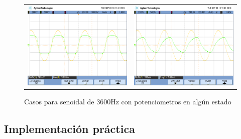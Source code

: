\begin{figure}[H]
\begin{tabular}{c c}
        \includegraphics[scale=0.2]{../EJ5/Mediciones/Osciloscopio/Senoide_3600_Medio/scope_16.png} &
        \includegraphics[scale=0.2]{../EJ5/Mediciones/Osciloscopio/Senoide_3600_Medio/scope_17.png}
    \end{tabular}
    \caption{Casos para senoidal de 3600Hz con potenciometros en alg\'un estado}
    \label{fig:senoide_3600_medio}
\end{figure}

\subsection{Implementaci\'on pr\'actica}

